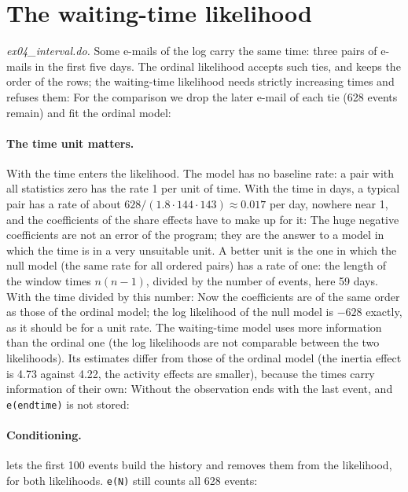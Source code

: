 \section{The waiting-time likelihood}\label{sec:ex-interval}

\emph{ex04\_interval.do.} Some e-mails of the log carry the same time: three pairs of e-mails in the first five days. The ordinal likelihood accepts such ties, and keeps the order of the rows; the waiting-time likelihood needs strictly increasing times and refuses them:
For the comparison we drop the later e-mail of each tie (628 events remain) and fit the ordinal model:
\paragraph{The time unit matters.} With  the time enters the likelihood. The model has no baseline rate: a pair with all statistics zero has the rate 1 per unit of time. With the time in days, a typical pair has a rate of about $628/(1.8\cdot 144\cdot 143)\approx0.017$ per day, nowhere near 1, and the coefficients of the share effects have to make up for it:
The huge negative coefficients are not an error of the program; they are the answer to a model in which the time is in a very unsuitable unit. A better unit is the one in which the null model (the same rate for all ordered pairs) has a rate of one: the length of the window times $n(n-1)$, divided by the number of events, here 59 days. With the time divided by this number:
Now the coefficients are of the same order as those of the ordinal model; the log likelihood of the null model is $-628$ exactly, as it should be for a unit rate. The waiting-time model uses more information than the ordinal one (the log likelihoods are not comparable between the two likelihoods). Its estimates differ from those of the ordinal model (the inertia effect is 4.73 against 4.22, the activity effects are smaller), because the times carry information of their own:
Without  the observation ends with the last event, and \texttt{e(endtime)} is not stored:
\paragraph{Conditioning.}  lets the first 100 events build the history and removes them from the likelihood, for both likelihoods. \texttt{e(N)} still counts all 628 events:

